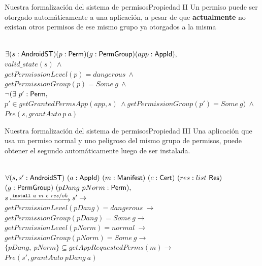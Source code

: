 \documentclass[pdf, handout]{beamer} %
\begin{document}
\begin{frame}{Nuestra formalización del sistema de permisos}{Propiedad II}
    Un permiso puede ser otorgado automáticamente a una aplicación, a pesar de que
    \textbf{actualmente} no existan otros permisos de ese mismo grupo ya otorgados a la misma
    \pause \vspace{20px}
    \begin{prop} \mbox{} \\
        \fontsize{9pt}{15pt}\selectfont
        $\exists (s:\mathsf{AndroidST}) (p:\mathsf{Perm}) (g:\mathsf{PermGroup}) (app:\mathsf{AppId}),$ \\
        $valid\_state(s)\ \land$ \\
        $getPermissionLevel(p) = dangerous\ \land$ \\
        $getPermissionGroup(p) = Some\ g\ \land$ \\
        $\neg (\exists\ p': \mathsf{Perm},$\\
        \hspace{10px}$p' \in getGrantedPermsApp(app,s)~ \land getPermissionGroup(p') = Some\ g)\ \land$\\
        $Pre(s, grantAuto~p~a)$
    \end{prop}
\end{frame}

\begin{frame}{Nuestra formalización del sistema de permisos}{Propiedad III}
    Una aplicación que usa un permiso normal y uno peligroso del mismo grupo de permisos, puede obtener el segundo automáticamente luego de ser instalada.
    \pause
    \begin{prop} \mbox{} \\
        \fontsize{9pt}{15pt}\selectfont
        $\forall (s,s': \mathsf{AndroidST})~(a: \mathsf{AppId})~(m: \mathsf{Manifest})~(c: \mathsf{Cert})~(res: list~\mathsf{Res})$\\
        $(g:\mathsf{PermGroup})~(pDang~pNorm: \mathsf{Perm}),$\\
        \hspace{15px}$\Mathexecrel{s}{\texttt{install}~a~m~c~res/ok}{s'} \rightarrow$ \\
        \hspace{15px}$getPermissionLevel(pDang) = dangerous~ \rightarrow$ \\
        \hspace{15px}$getPermissionGroup(pDang) = Some\ g \rightarrow$ \\
        \hspace{15px}$getPermissionLevel(pNorm) = normal~ \rightarrow$ \\
        \hspace{15px}$getPermissionGroup(pNorm) = Some\ g \rightarrow$ \\
        \hspace{15px}$\{pDang,~pNorm\} \subseteq getAppRequestedPerms(m) \rightarrow$\\
        \hspace{15px}$Pre(s', grantAuto~pDang~a)$
    \end{prop}
\end{frame}
\end{document}
